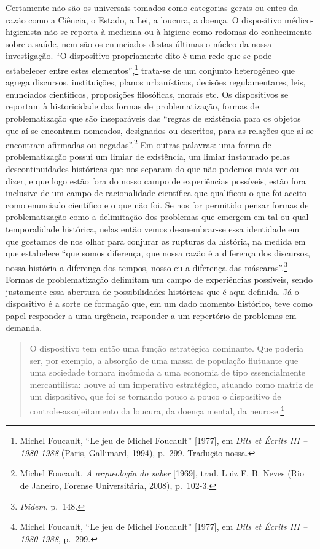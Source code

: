 Certamente não são os universais tomados como categorias gerais ou entes
da razão como a Ciência, o Estado, a Lei, a loucura, a doença. O
dispositivo médico-higienista não se reporta à medicina ou à higiene
como redomas do conhecimento sobre a saúde, nem são os enunciados destas
últimas o núcleo da nossa investigação. ``O dispositivo propriamente
dito é uma rede que se pode estabelecer entre estes
elementos'',\footnote{Michel Foucault, ``Le jeu de Michel Foucault''
  {[}1977{]}, em \emph{Dits et Écrits III -- 1980-1988} (Paris,
  Gallimard, 1994), p.~299. Tradução nossa.} trata-se de um conjunto
heterogêneo que agrega discursos, instituições, planos urbanísticos,
decisões regulamentares, leis, enunciados científicos, proposições
filosóficas, morais etc. Os dispositivos se reportam à historicidade das
formas de problematização, formas de problematização que são
inseparáveis das ``regras de existência para os objetos que aí se
encontram nomeados, designados ou descritos, para as relações que aí se
encontram afirmadas ou negadas''.\footnote{Michel Foucault, \emph{A
  arqueologia do saber} {[}1969{]}, trad. Luiz F. B. Neves (Rio de
  Janeiro, Forense Universitária, 2008), p.~102-3.} Em outras palavras:
uma forma de problematização possui um limiar de existência, um limiar
instaurado pelas descontinuidades históricas que nos separam do que não
podemos mais ver ou dizer, e que logo estão fora do nosso campo de
experiências possíveis, estão fora inclusive de um campo de
racionalidade científica que qualificou o que foi aceito como enunciado
científico e o que não foi. Se nos for permitido pensar formas de
problematização como a delimitação dos problemas que emergem em tal ou
qual temporalidade histórica, nelas então vemos desmembrar-se essa
identidade em que gostamos de nos olhar para conjurar as rupturas da
história, na medida em que estabelece ``que somos diferença, que nossa
razão é a diferença dos discursos, nossa história a diferença dos
tempos, nosso eu a diferença das máscaras''.\footnote{\emph{Ibidem},
  p.~148.} Formas de problematização delimitam um campo de experiências
possíveis, sendo justamente essa abertura de possibilidades históricas
que é aqui definida. Já o dispositivo é a sorte de formação que, em um
dado momento histórico, teve como papel responder a uma urgência,
responder a um repertório de problemas em demanda.

{}

\begin{quote}
O dispositivo tem então uma função estratégica dominante. Que poderia
ser, por exemplo, a absorção de uma massa de população flutuante que uma
sociedade tornara incômoda a uma economia de tipo essencialmente
mercantilista: houve aí um imperativo estratégico, atuando como matriz
de um dispositivo, que foi se tornando pouco a pouco o dispositivo de
controle-assujeitamento da loucura, da doença mental, da
neurose.\footnote{Michel Foucault, ``Le jeu de Michel Foucault''
  {[}1977{]}, em \emph{Dits et Écrits III -- 1980-1988}, p.~299.}
\end{quote}

